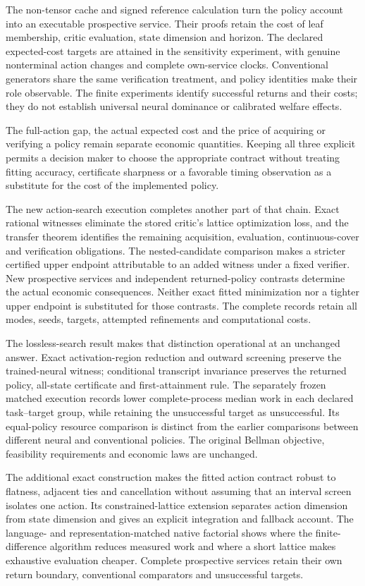 \documentclass[ecta,nameyear,draft]{econsocart}
\begin{document}
The non-tensor cache and signed reference calculation turn the policy account into an executable prospective service. Their proofs retain the cost of leaf membership, critic evaluation, state dimension and horizon. The declared expected-cost targets are attained in the sensitivity experiment, with genuine nonterminal action changes and complete own-service clocks. Conventional generators share the same verification treatment, and policy identities make their role observable. The finite experiments identify successful returns and their costs; they do not establish universal neural dominance or calibrated welfare effects.

The full-action gap, the actual expected cost and the price of acquiring or verifying a policy remain separate economic quantities. Keeping all three explicit permits a decision maker to choose the appropriate contract without treating fitting accuracy, certificate sharpness or a favorable timing observation as a substitute for the cost of the implemented policy.

The new action-search execution completes another part of that chain. Exact rational witnesses eliminate the stored critic's lattice optimization loss, and the transfer theorem identifies the remaining acquisition, evaluation, continuous-cover and verification obligations. The nested-candidate comparison makes a stricter certified upper endpoint attributable to an added witness under a fixed verifier. New prospective services and independent returned-policy contrasts determine the actual economic consequences. Neither exact fitted minimization nor a tighter upper endpoint is substituted for those contrasts. The complete records retain all modes, seeds, targets, attempted refinements and computational costs.

The lossless-search result makes that distinction operational at an unchanged answer. Exact activation-region reduction and outward screening preserve the trained-neural witness; conditional transcript invariance preserves the returned policy, all-state certificate and first-attainment rule. The separately frozen matched execution records lower complete-process median work in each declared task--target group, while retaining the unsuccessful target as unsuccessful. Its equal-policy resource comparison is distinct from the earlier comparisons between different neural and conventional policies. The original Bellman objective, feasibility requirements and economic laws are unchanged.


The additional exact construction makes the fitted action contract robust to flatness, adjacent ties and cancellation without assuming that an interval screen isolates one action. Its constrained-lattice extension separates action dimension from state dimension and gives an explicit integration and fallback account. The language- and representation-matched native factorial shows where the finite-difference algorithm reduces measured work and where a short lattice makes exhaustive evaluation cheaper. Complete prospective services retain their own return boundary, conventional comparators and unsuccessful targets.
\end{document}
